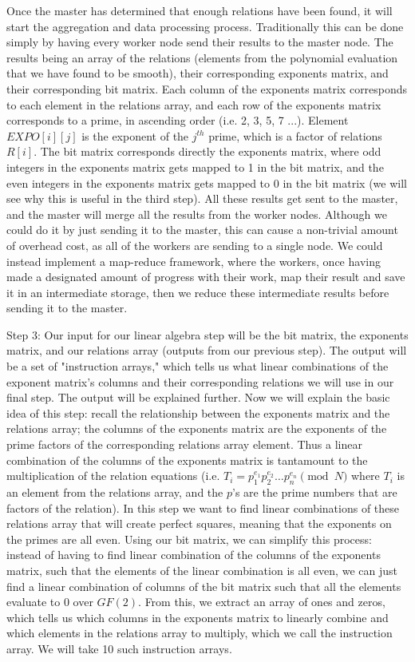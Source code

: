 \documentclass[11pt,twocolumn]{article}
\begin{document}
Once the master has determined that enough relations have been found, it will start the aggregation and data processing process. Traditionally this can be done simply by having every worker node send their results to the master node. The results being an array of the relations (elements from the polynomial evaluation that we have found to be smooth), their corresponding exponents matrix, and their corresponding bit matrix. Each column of the exponents matrix corresponds to each element in the relations array, and each row of the exponents matrix corresponds to a prime, in ascending order (i.e. 2, 3, 5, 7 ...). Element $EXPO[i][j]$ is the exponent of the $j^{th}$ prime, which is a factor of relations $R[i]$. The bit matrix corresponds directly the exponents matrix, where odd integers in the exponents matrix gets mapped to 1 in the bit matrix, and the even integers in the exponents matrix gets mapped to 0 in the bit matrix (we will see why this is useful in the third step). All these results get sent to the master, and the master will merge all the results from the worker nodes. Although we could do it by just sending it to the master, this can cause a non-trivial amount of overhead cost, as all of the workers are sending to a single node. We could instead implement a map-reduce framework, where the workers, once having made a designated amount of progress with their work, map their result and save it in an intermediate storage, then we reduce these intermediate results before sending it to the master.

Step 3: Our input for our linear algebra step will be the bit matrix, the exponents matrix, and our relations array (outputs from our previous step). The output will be a set of "instruction arrays," which tells us what linear combinations of the exponent matrix's columns and their corresponding relations we will use in our final step. The output will be explained further. Now we will explain the basic idea of this step: recall the relationship between the exponents matrix and the relations array; the columns of the exponents matrix are the exponents of the prime factors of the corresponding relations array element. Thus a linear combination of the columns of the exponents matrix is tantamount to the multiplication of the relation equations (i.e. $T_i = p_1^{e_1} p_2^{e_2} \ldots p_n^{e_n} \pmod{N}$ where $T_i$ is an element from the relations array, and the $p$'s are the prime numbers that are factors of the relation). In this step we want to find linear combinations of these relations array that will create perfect squares, meaning that the exponents on the primes are all even. Using our bit matrix, we can simplify this process: instead of having to find linear combination of the columns of the exponents matrix, such that the elements of the linear combination is all even, we can just find a linear combination of columns of the bit matrix such that all the elements evaluate to $0$ over $GF(2)$. From this, we extract an array of ones and zeros, which tells us which columns in the exponents matrix to linearly combine and which elements in the relations array to multiply, which we call the instruction array. We will take 10 such instruction arrays.
\end{document}
